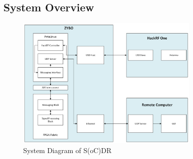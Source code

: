 \documentclass[conference]{IEEEtran}
\begin{document}
\subsection{System Overview}
\label{subsec:sysoverview}
\begin{figure}[htbp]
  \centering
  \includegraphics[width=3.5in]{images/systemdiagram.png} %
  \caption{System Diagram of S(oC)DR}
  \label{fig:sysdiagram}
\end{figure}
\end{document}
